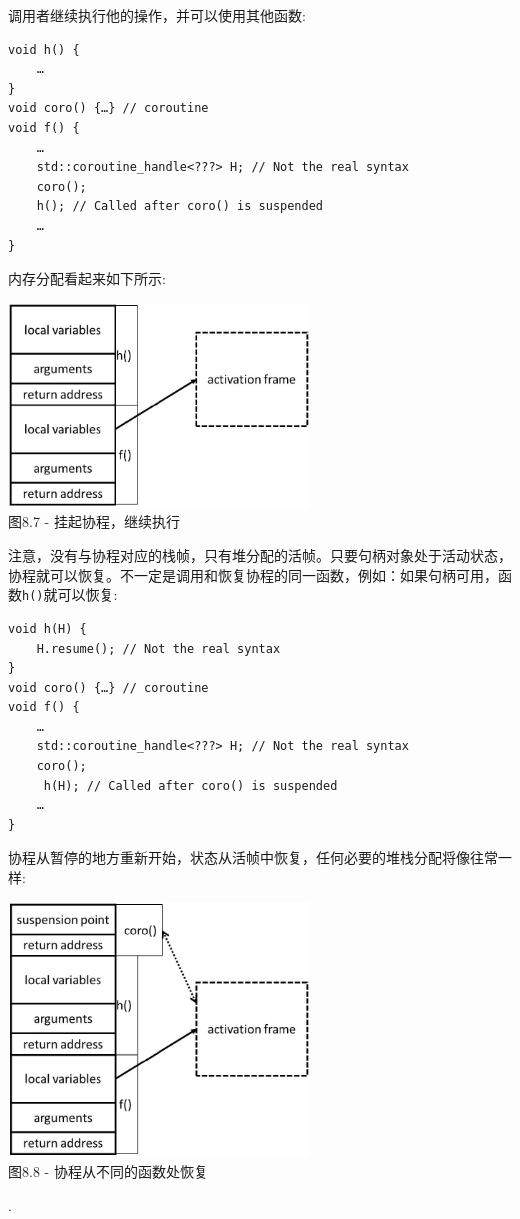 调用者继续执行他的操作，并可以使用其他函数:

\begin{lstlisting}[style=styleCXX]
void h() {
	…
}
void coro() {…} // coroutine
void f() {
	…
	std::coroutine_handle<???> H; // Not the real syntax
	coro();
	h(); // Called after coro() is suspended
	…
}
\end{lstlisting}

内存分配看起来如下所示:

\begin{center}
\includegraphics[width=0.6\textwidth]{content/2/chapter8/images/7.jpg}\\
图8.7 - 挂起协程，继续执行
\end{center}

注意，没有与协程对应的栈帧，只有堆分配的活帧。只要句柄对象处于活动状态，协程就可以恢复。不一定是调用和恢复协程的同一函数，例如：如果句柄可用，函数\texttt{h()}就可以恢复:

\begin{lstlisting}[style=styleCXX]
void h(H) {
	H.resume(); // Not the real syntax
}
void coro() {…} // coroutine
void f() {
	…
	std::coroutine_handle<???> H; // Not the real syntax
	coro();
	 h(H); // Called after coro() is suspended
	…
}
\end{lstlisting}

协程从暂停的地方重新开始，状态从活帧中恢复，任何必要的堆栈分配将像往常一样:

\begin{center}
\includegraphics[width=0.6\textwidth]{content/2/chapter8/images/8.jpg}\\
图8.8 - 协程从不同的函数处恢复
\end{center}.

